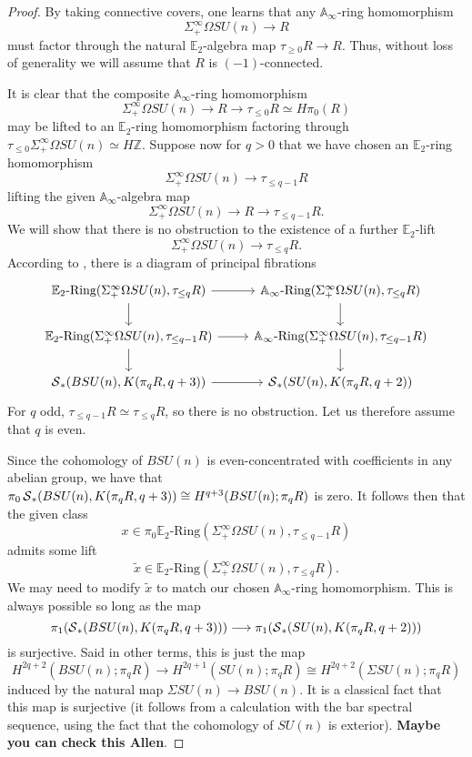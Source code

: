 \begin{proof} 
By taking connective covers, one learns that any $\mathbb{A}_\infty$-ring homomorphism
$$\Sigma^{\infty}_+ \Omega SU(n) \rightarrow R$$
must factor through the natural $\mathbb{E}_2$-algebra map $\tau_{\ge 0} R \rightarrow R$.  Thus, without loss of generality we will assume that $R$ is $(-1)$-connected.

It is clear that the composite $\mathbb{A}_\infty$-ring homomorphism
$$\Sigma^{\infty}_+ \Omega SU(n) \longrightarrow R \longrightarrow \tau_{\le 0} R \simeq H\pi_0(R)$$
may be lifted to an $\mathbb{E}_2$-ring homomorphism factoring through $\tau_{\le 0} \Sigma^{\infty}_+ \Omega SU(n) \simeq H\mathbb{Z}$.   Suppose now for $q>0$ that we have chosen an $\mathbb{E}_2$-ring homomorphism 
$$\Sigma^{\infty}_+ \Omega SU(n) \longrightarrow \tau_{\le q-1} R$$
lifting the given $\mathbb{A}_\infty$-algebra map
$$\Sigma^{\infty}_+ \Omega SU(n) \longrightarrow R \longrightarrow \tau_{\le q-1} R.$$
We will show that there is no obstruction to the existence of a further $\mathbb{E}_2$-lift $$\Sigma^{\infty}_+ \Omega SU(n) \longrightarrow \tau_{\le q} R.$$
According to \cite[Theorem $4.1$]{ChadwickMandell}, there is a diagram of principal fibrations
$$
\begin{tikzcd}
\mathbb{E}_2\text{-Ring}(\Sigma^{\infty}_+ \Omega SU(n), \tau_{\le q} R) \arrow{r} \arrow{d} & \mathbb{A}_\infty\text{-Ring}(\Sigma^{\infty}_+ \Omega SU(n), \tau_{\le q} R) \arrow{d} \\
\mathbb{E}_2\text{-Ring}(\Sigma^{\infty}_+ \Omega SU(n), \tau_{\le q-1} R) \arrow{r} \arrow{d} & \mathbb{A}_\infty\text{-Ring}(\Sigma^{\infty}_+ \Omega SU(n), \tau_{\le q-1} R) \arrow{d} \\
\cS_*(BSU(n),K(\pi_q R,q+3)) \arrow{r} & \cS_*(SU(n),K(\pi_q R,q+2))
\end{tikzcd}
$$
For $q$ odd, $\tau_{\le q-1} R \simeq \tau_{\le q} R$, so there is no obstruction.  Let us therefore assume that $q$ is even.

Since the cohomology of $BSU(n)$ is even-concentrated with coefficients in any abelian group, we have that $\pi_0 \operatorname{\mathcal{S}}_*(BSU(n),K(\pi_q R,q+3)) \cong H^{q+3}(BSU(n);\pi_q R)$ is zero.  It follows then that the given class $$x \in \pi_0 \mathbb{E}_2\text{-Ring}(\Sigma^{\infty}_+ \Omega SU(n), \tau_{\le q-1} R)$$ admits some lift $$\widetilde{x} \in \mathbb{E}_2\text{-Ring}(\Sigma^{\infty}_+ \Omega SU(n), \tau_{\le q} R).$$  We may need to modify $\widetilde{x}$ to match our chosen $\mathbb{A}_\infty$-ring homomorphism.  This is always possible so long as the map
$$\pi_1(\operatorname{\mathcal{S}}_*(BSU(n),K(\pi_q R,q+3))) \longrightarrow \pi_1(\operatorname{\mathcal{S}}_*(SU(n),K(\pi_q R,q+2)))$$
is surjective.  Said in other terms, this is just the map
$$H^{2q+2}(BSU(n);\pi_q R) \longrightarrow H^{2q+1}(SU(n);\pi_q R) \cong H^{2q+2}(\Sigma SU(n);\pi_q R)$$
induced by the natural map $\Sigma SU(n) \rightarrow BSU(n)$.  It is a classical fact that this map is surjective (it follows from a calculation with the bar spectral sequence, using the fact that the cohomology of $SU(n)$ is exterior). \textbf{Maybe you can check this Allen}.
\end{proof}
